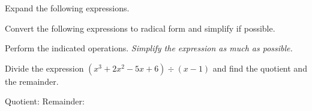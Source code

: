 \documentclass[11pt]{exam}
\begin{document}
\begin{questions}
\question[20] Expand the following expressions.
\noaddpoints
\vspace{2pt}
\addpoints

\question[10] Convert the following expressions to radical form and simplify if possible. 
\noaddpoints
\vspace{2pt}

\begin{parts}
\end{parts}
\vspace{2.5in}
\addpoints

\question[20] Perform the indicated operations. \emph{Simplify the expression as much as possible.}
\noaddpoints
\vspace{2pt}
\addpoints

\question[10] Divide the expression $(x^3 + 2x^2 - 5x + 6) \div (x - 1)$ and find the quotient and the remainder.
\addpoints
\vspace{3.2in}

Quotient: \hfill Remainder: \hspace{2in}

\end{questions}
\end{document}
